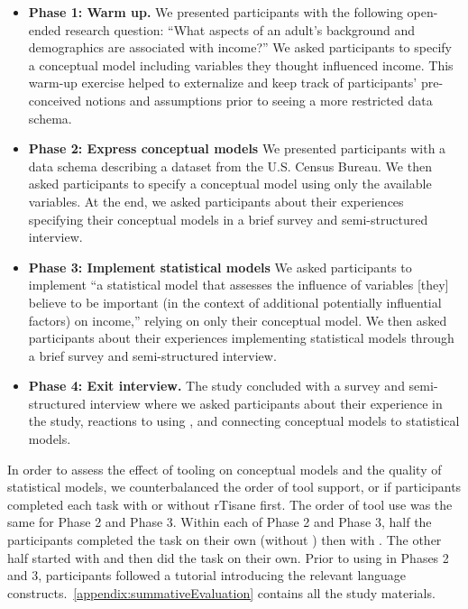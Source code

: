 \begin{itemize}
    \item \textbf{Phase 1: Warm up.} We presented participants with the
    following open-ended research question: ``What aspects of an adult's
    background and demographics are associated with income?'' We asked
    participants to specify a conceptual model including variables they thought
    influenced income. This warm-up exercise helped to externalize and keep
    track of participants' pre-conceived notions and assumptions prior to seeing
    a more restricted data schema.
    \item \textbf{Phase 2: Express conceptual models} We presented participants
    with a data schema describing a dataset from the U.S. Census Bureau. We then
    asked participants to specify a conceptual model using only the available
    variables. At the end, we asked participants about their
    experiences specifying their conceptual models in a brief survey and semi-structured interview.
    \item \textbf{Phase 3: Implement statistical models} We asked participants
    to implement ``a statistical model that assesses the influence of variables
    [they] believe to be important (in the context of additional potentially
    influential factors) on income,'' relying on only their conceptual model. We
    then asked participants about their experiences implementing statistical
    models through a brief survey and semi-structured interview. 
    \item \textbf{Phase 4: Exit interview.} The study concluded with a survey
    and semi-structured interview where we asked participants about their
    experience in the study, reactions to using \rTisane, and connecting
    conceptual models to statistical models.
\end{itemize} 

In order to assess the effect of tooling on conceptual models and the quality of
statistical models, we counterbalanced the order of tool support, or if
participants completed each task with or without rTisane first. The order of
tool use was the same for Phase 2 and Phase 3. Within each of Phase 2 and Phase 3,
half the participants completed the task on their own (without \rTisane) then
with \rTisane. The other half started with \rTisane and then did the task on
their own. Prior to using \rTisane in Phases 2 and 3, participants followed a
tutorial introducing the relevant language
constructs.~\autoref{appendix:summativeEvaluation} contains all the study
materials.

